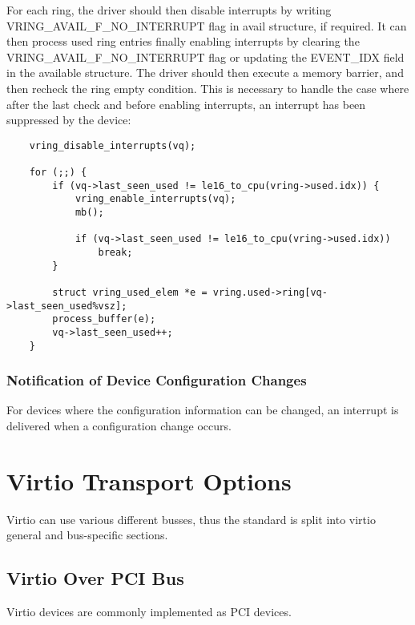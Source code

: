 For each ring, the driver should then disable interrupts by writing
VRING_AVAIL_F_NO_INTERRUPT flag in avail structure, if required.
It can then process used ring entries finally enabling interrupts
by clearing the VRING_AVAIL_F_NO_INTERRUPT flag or updating the
EVENT_IDX field in the available structure.  The driver should then
execute a memory barrier, and then recheck the ring empty
condition. This is necessary to handle the case where after the
last check and before enabling interrupts, an interrupt has been
suppressed by the device:

\begin{lstlisting}
	vring_disable_interrupts(vq);

	for (;;) {
		if (vq->last_seen_used != le16_to_cpu(vring->used.idx)) {
			vring_enable_interrupts(vq);
			mb();

			if (vq->last_seen_used != le16_to_cpu(vring->used.idx))
				break;
		}

		struct vring_used_elem *e = vring.used->ring[vq->last_seen_used%vsz];
		process_buffer(e);
		vq->last_seen_used++;
	}
\end{lstlisting}

\subsection{Notification of Device Configuration Changes}\label{sec:General Initialization And Device Operation / Device Operation / Notification of Device Configuration Changes}

For devices where the configuration information can be changed, an
interrupt is delivered when a configuration change occurs.



\chapter{Virtio Transport Options}\label{sec:Virtio Transport Options}

Virtio can use various different busses, thus the standard is split
into virtio general and bus-specific sections.

\section{Virtio Over PCI Bus}\label{sec:Virtio Transport Options / Virtio Over PCI Bus}

Virtio devices are commonly implemented as PCI devices.

